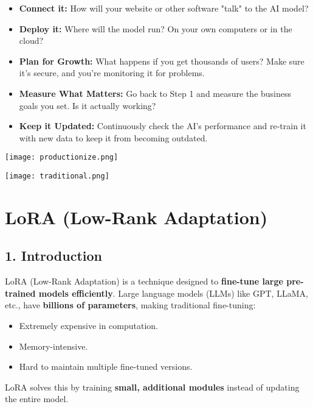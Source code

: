 \documentclass[a4paper, 12pt]{article}
\begin{document}
\begin{itemize}
    \item \textbf{Connect it:} How will your website or other software "talk" to the AI model?
    \item \textbf{Deploy it:} Where will the model run? On your own computers or in the cloud?
    \item \textbf{Plan for Growth:} What happens if you get thousands of users? Make sure it's secure, and you're monitoring it for problems.
    \item \textbf{Measure What Matters:} Go back to Step 1 and measure the business goals you set. Is it actually working?
    \item \textbf{Keep it Updated:} Continuously check the AI's performance and re-train it with new data to keep it from becoming outdated.
\end{itemize}


\begin{center}
\texttt{[image: productionize.png]}
\end{center}
\begin{center}
\texttt{[image: traditional.png]}
\end{center}

\newpage
\section*{LoRA (Low-Rank Adaptation)}

\subsection*{1. Introduction}
LoRA (Low-Rank Adaptation) is a technique designed to \textbf{fine-tune large pre-trained models efficiently}. Large language models (LLMs) like GPT, LLaMA, etc., have \textbf{billions of parameters}, making traditional fine-tuning:

\begin{itemize}
    \item Extremely expensive in computation.
    \item Memory-intensive.
    \item Hard to maintain multiple fine-tuned versions.
\end{itemize}

LoRA solves this by training \textbf{small, additional modules} instead of updating the entire model.
\end{document}
